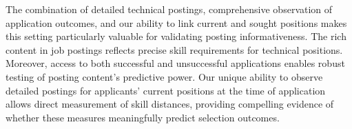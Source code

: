 The combination of detailed technical postings, comprehensive observation of application outcomes, and our ability to link current and sought positions makes this setting particularly valuable for validating posting informativeness. The rich content in job postings reflects precise skill requirements for technical positions. Moreover, access to both successful and unsuccessful applications enables robust testing of posting content's predictive power. Our unique ability to observe detailed postings for applicants' current positions at the time of application allows direct measurement of skill distances, providing compelling evidence of whether these measures meaningfully predict selection outcomes.
